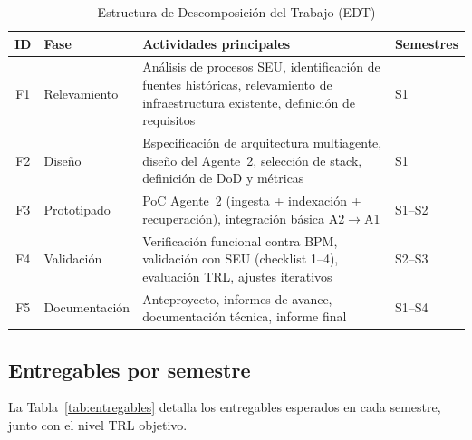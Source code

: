 \documentclass[a4paper, 12pt]{article}
\begin{document}
\begin{table}[htbp]
  \centering
  \caption{Estructura de Descomposici\'on del Trabajo (EDT)}
  \label{tab:edt}
  \begin{tabularx}{\textwidth}{clXl}
    \toprule
    \textbf{ID} & \textbf{Fase} & \textbf{Actividades principales} & \textbf{Semestres} \\
    \midrule
    F1 & Relevamiento & An\'alisis de procesos SEU, identificaci\'on de fuentes hist\'oricas, relevamiento de infraestructura existente, definici\'on de requisitos & S1 \\
    F2 & Dise\~no & Especificaci\'on de arquitectura multiagente, dise\~no del Agente~2, selecci\'on de stack, definici\'on de DoD y m\'etricas & S1 \\
    F3 & Prototipado & PoC Agente~2 (ingesta + indexaci\'on + recuperaci\'on), integraci\'on b\'asica A2$\rightarrow$A1 & S1--S2 \\
    F4 & Validaci\'on & Verificaci\'on funcional contra BPM, validaci\'on con SEU (checklist 1--4), evaluaci\'on TRL, ajustes iterativos & S2--S3 \\
    F5 & Documentaci\'on & Anteproyecto, informes de avance, documentaci\'on t\'ecnica, informe final & S1--S4 \\
    \bottomrule
  \end{tabularx}
\end{table}

\subsection{Entregables por semestre}

La Tabla~\ref{tab:entregables} detalla los entregables esperados en cada semestre, junto con el nivel \ac{TRL} objetivo.
\end{document}
